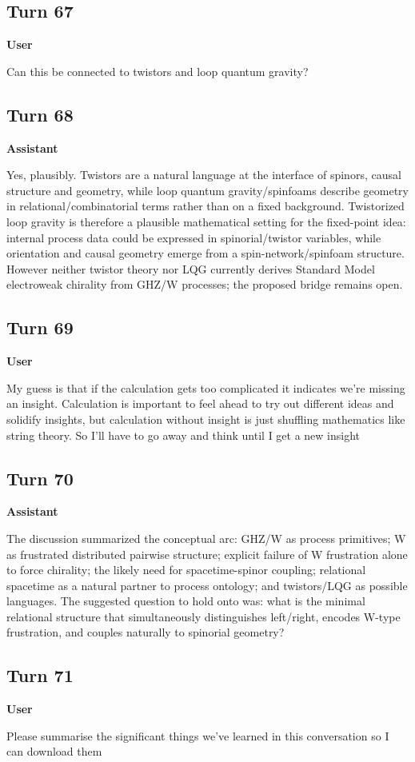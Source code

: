 \documentclass[11pt,a4paper]{article}
\newcommand{\speaker}[1]{\par\medskip\noindent\textbf{\large #1}\par\smallskip}
\begin{document}
\subsection*{Turn 67}
\speaker{User}
Can this be connected to twistors and loop quantum gravity?
\subsection*{Turn 68}
\speaker{Assistant}
Yes, plausibly. Twistors are a natural language at the interface of spinors, causal structure and geometry, while loop quantum gravity/spinfoams describe geometry in relational/combinatorial terms rather than on a fixed background. Twistorized loop gravity is therefore a plausible mathematical setting for the fixed-point idea: internal process data could be expressed in spinorial/twistor variables, while orientation and causal geometry emerge from a spin-network/spinfoam structure. However neither twistor theory nor LQG currently derives Standard Model electroweak chirality from GHZ/W processes; the proposed bridge remains open.
\subsection*{Turn 69}
\speaker{User}
My guess is that if the calculation gets too complicated it indicates we're missing an insight. Calculation is important to feel ahead to try out different ideas and solidify insights, but calculation without insight is just shuffling mathematics like string theory. So I'll have to go away and think until I get a new insight
\subsection*{Turn 70}
\speaker{Assistant}
The discussion summarized the conceptual arc: GHZ/W as process primitives; W as frustrated distributed pairwise structure; explicit failure of W frustration alone to force chirality; the likely need for spacetime-spinor coupling; relational spacetime as a natural partner to process ontology; and twistors/LQG as possible languages. The suggested question to hold onto was: what is the minimal relational structure that simultaneously distinguishes left/right, encodes W-type frustration, and couples naturally to spinorial geometry?
\subsection*{Turn 71}
\speaker{User}
Please summarise the significant things we've learned in this conversation so I can download them
\end{document}

